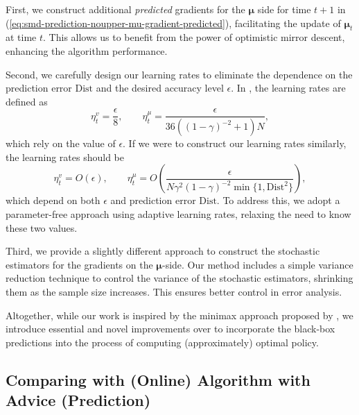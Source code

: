 \documentclass[12pt]{article}
\begin{document}
First, we construct additional \textit{predicted} gradients for the $\boldsymbol{\mu}$ side for time $t+1$ in (\ref{eq:smd-prediction-noupper-mu-gradient-predicted}), facilitating the update of $\boldsymbol{\mu}_t$ at time $t$. This allows us to benefit from the power of optimistic mirror descent, enhancing the algorithm performance.

Second, we carefully design our learning rates to eliminate the dependence on the prediction error $\text{Dist}$ and the desired accuracy level $\epsilon$. In \cite{jin2020efficiently}, the learning rates are defined as
\begin{equation*}
    \eta_t^v = \frac{\epsilon}{8},\qquad \eta_t^\mu = \frac{\epsilon}{36 ((1-\gamma)^{-2}+1)N},
\end{equation*}
which rely on the value of $\epsilon$. If we were to construct our learning rates similarly, the learning rates should be 
\begin{equation*}
    \eta_t^v = O (\epsilon),\qquad \eta_t^\mu = O \left( \frac{\epsilon}{N \gamma^2(1-\gamma)^{-2}\min \{1,\text{Dist}^2\} }\right),
\end{equation*}
which depend on both $\epsilon$ and prediction error $\text{Dist}$. To address this, we adopt a parameter-free approach using adaptive learning rates, relaxing the need to know these two values.

Third, we provide a slightly different approach to construct the stochastic estimators for the gradients on the $\boldsymbol{\mu}$-side. Our method includes a simple variance reduction technique to control the variance of the stochastic estimators, shrinking them as the sample size increases. This ensures better control in error analysis.

Altogether, while our work is inspired by the minimax approach proposed by \cite{jin2020efficiently}, we introduce essential and novel improvements over \cite{jin2020efficiently} to incorporate the black-box predictions into the process of computing (approximately) optimal policy.

\subsection{Comparing with (Online) Algorithm with Advice (Prediction)}

\label{sec:app-com-alg-advice}
\end{document}
